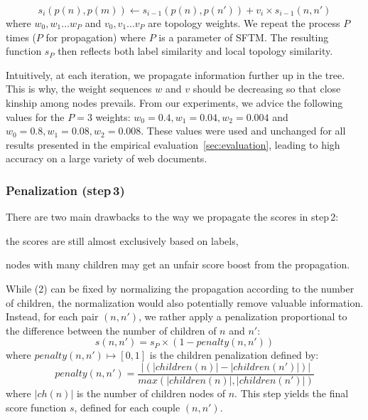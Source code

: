 \begin{equation}\label{eq:score_parent}
	s_{i}(p(n), p(m)) \gets s_{i-1}(p(n), p(n')) +  v_i \times s_{i-1}(n, n')
\end{equation}
where $w_0, w_1\dots w_{P}$ and $v_0, v_1 ... v_P$ are topology weights.
We repeat the process $P$ times ($P$ for propagation) where $P$ is a parameter of SFTM.
The resulting function $s_{P}$ then reflects both label similarity and local topology similarity.

Intuitively, at each iteration, we propagate information further up in the tree.
This is why, the weight sequences $w$ and $v$ should be decreasing so that close kinship among nodes prevails.
From our experiments, we advice the following values for the $P=3$ weights: $w_0 = 0.4, w_1 = 0.04, w_2 = 0.004$ and $w_0 = 0.8, w_1 = 0.08, w_2 = 0.008$.
These values were used and unchanged for all results presented in the empirical evaluation~\ref{sec:evaluation}, leading to high accuracy on a large variety of web documents.

\subsubsection{Penalization (step\,3)}
There are two main drawbacks to the way we propagate the scores in step\,2:
\begin{inparaenum}
\item the scores are still almost exclusively based on labels,
\item nodes with many children may get an unfair score boost from the propagation.
\end{inparaenum}

While (2) can be fixed by normalizing the propagation according to the number of children, the normalization would also potentially remove valuable information.
Instead, for each pair $(n,n')$, we rather apply a penalization proportional to the difference between the number of children of $n$ and $n'$:
\begin{equation}
s(n,n') = s_{P} \times (1 - penalty(n,n'))
\end{equation}
where $penalty(n,n') \mapsto [0, 1]$ is the children penalization defined by:
\begin{equation}
penalty(n,n') = \frac{|(|children(n)|-|children(n')|)|}{max(|children(n)|,|children(n')|)}
\end{equation}
where $|ch(n)|$ is the number of children nodes of $n$.
This step yields the final score function $s$, defined for each couple $(n,n')$.

